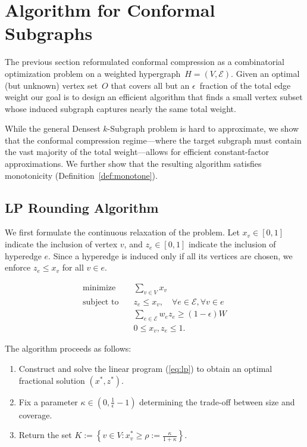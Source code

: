 \section{Algorithm for Conformal Subgraphs}
\label{sec:algorithm}

The previous section reformulated conformal compression as a combinatorial optimization problem on a weighted hypergraph~$H=(V,\mathcal E)$. Given an optimal (but unknown) vertex set~$O$ that covers all but an $\epsilon$~fraction of the total edge weight our goal is to design an efficient algorithm that finds a small vertex subset whose induced subgraph captures nearly the same total weight.

While the general Densest $k$-Subgraph problem is hard to approximate, we show that the conformal compression regime---where the target subgraph must contain the vast majority of the total weight---allows for efficient constant-factor approximations. We further show that the resulting algorithm satisfies monotonicity (Definition~\ref{def:monotone}).  %

\subsection{LP Rounding Algorithm} 
\label{sec:lp}
We first formulate the continuous relaxation of the problem. Let $x_v \in [0,1]$ indicate the inclusion of vertex $v$, and $z_e \in [0,1]$ indicate the inclusion of hyperedge $e$. Since a hyperedge is induced only if all its vertices are chosen, we enforce $z_e \le x_v$ for all $v \in e$.

\begin{equation}
\label{eq:lp}
\begin{aligned}
\text{minimize} \quad & \sum_{v \in V} x_v \\
\text{subject to} \quad & z_e \le x_v, \quad \forall e \in \mathcal{E}, \forall v \in e \\
& \sum_{e \in \mathcal{E}} w_e z_e \ge (1-\epsilon)W \\
& 0 \le x_v, z_e \le 1.
\end{aligned}
\end{equation}

The algorithm proceeds as follows:
\begin{enumerate}
  \item Construct and solve the linear program (\ref{eq:lp}) to obtain an optimal fractional solution $(x^*, z^*)$.
  \item Fix a parameter $\kappa \in \left(0,\frac{1}{\epsilon}-1 \right)$ determining the trade-off between size and coverage.
  \item Return the set $K := \left\{ v \in V : x^*_v \ge \rho := \frac{\kappa}{1+\kappa} \right\}$.
\end{enumerate}


